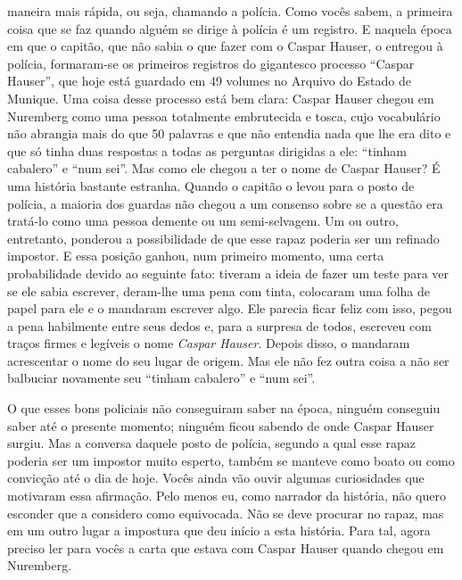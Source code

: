maneira mais rápida, ou seja, chamando a polícia. Como vocês sabem, a
primeira coisa que se faz quando alguém se dirige à polícia é um
registro. E naquela época em que o capitão, que não sabia o que fazer
com o Caspar Hauser, o entregou à polícia, formaram-se os primeiros
registros do gigantesco processo ``Caspar Hauser'', que hoje está
guardado em 49 volumes no Arquivo do Estado de Munique. Uma coisa desse
processo está bem clara: Caspar Hauser chegou em Nuremberg como uma
pessoa totalmente embrutecida e tosca, cujo vocabulário não abrangia
mais do que 50 palavras e que não entendia nada que lhe era dito e que
só tinha duas respostas a todas as perguntas dirigidas a ele: ``tinham
cabalero'' e ``num sei''. Mas como ele chegou a ter o nome de Caspar
Hauser? É uma história bastante estranha. Quando o capitão o levou para
o posto de polícia, a maioria dos guardas não chegou a um consenso sobre
se a questão era tratá-lo como uma pessoa demente ou um semi-selvagem.
Um ou outro, entretanto, ponderou a possibilidade de que esse rapaz
poderia ser um refinado impostor. E essa posição ganhou, num primeiro
momento, uma certa probabilidade devido ao seguinte fato: tiveram a
ideia de fazer um teste para ver se ele sabia escrever, deram-lhe uma
pena com tinta, colocaram uma folha de papel para ele e o mandaram
escrever algo. Ele parecia ficar feliz com isso, pegou a pena habilmente
entre seus dedos e, para a surpresa de todos, escreveu com traços firmes
e legíveis o nome \emph{Caspar Hauser}. Depois disso, o mandaram
acrescentar o nome do seu lugar de origem. Mas ele não fez outra coisa a
não ser balbuciar novamente seu ``tinham cabalero'' e ``num sei''.

O que esses bons policiais não conseguiram saber na época, ninguém
conseguiu saber até o presente momento; ninguém ficou sabendo de onde
Caspar Hauser surgiu. Mas a conversa daquele posto de polícia, segundo a
qual esse rapaz poderia ser um impostor muito esperto, também se manteve
como boato ou como convicção até o dia de hoje. Vocês ainda vão ouvir
algumas curiosidades que motivaram essa afirmação. Pelo menos eu, como
narrador da história, não quero esconder que a considero como
equivocada. Não se deve procurar no rapaz, mas em um outro lugar a
impostura que deu início a esta história. Para tal, agora preciso ler
para vocês a carta que estava com Caspar Hauser quando chegou em
Nuremberg.

